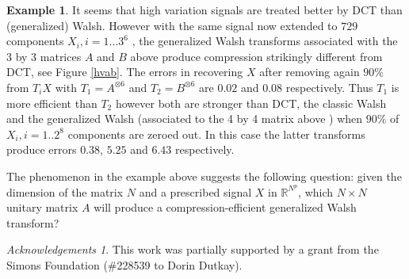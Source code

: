 \documentclass[11pt]{amsart}
\theoremstyle{definition}
\newtheorem{example}[theorem]{Example}
\theoremstyle{remark}
\newtheorem*{acknowledgements}{Acknowledgements}
\numberwithin{equation}{section}
\begin{document}
\begin{example}
It seems that high variation signals are treated better by DCT than (generalized) Walsh. However with the same signal now extended to $729$ components  $X_i, i=1...3^6$ , the generalized  Walsh transforms associated with the 3 by 3 matrices $A$ and $B$ above produce  compression strikingly different from DCT,  see Figure \ref{hvab}.  The errors in recovering $X$ after removing again $90\%$ from $T_iX$ with $T_1=A^{\otimes 6}$ and $T_2=B^{\otimes 6}$ are $0.02$ and $0.08$ respectively. Thus $T_1$ is more efficient than $T_2$ however both are stronger than DCT, the classic Walsh and the generalized Walsh (associated to the 4 by 4 matrix above ) when $90\%$ of $X_i, i=1..2^8$ components are zeroed out. In this case the latter transforms produce errors  $ 0.38$, $5.25$ and $ 6.43$ respectively.
\end{example}


The phenomenon in the example above suggests the following question: given the dimension of the matrix $N$ and a prescribed signal $X$ in $\mathbb R^{N^p}$, which $N\times N$ unitary matrix $A$ will produce a compression-efficient generalized Walsh transform? 









\begin{acknowledgements}
This work was partially supported by a grant from the Simons Foundation (\#228539 to Dorin Dutkay).

\end{acknowledgements}

	

\end{document}
